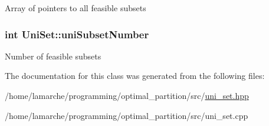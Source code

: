 Array of pointers to all feasible subsets \hypertarget{classUniSet_a159ec0413efd05616c2f2445b7d8b2b5}{
\subsubsection[{uni\-Subset\-Number}]{\setlength{\rightskip}{0pt plus 5cm}int Uni\-Set\-::uni\-Subset\-Number\hspace{0.3cm}{\ttfamily [protected]}}}\label{classUniSet_a159ec0413efd05616c2f2445b7d8b2b5}
Number of feasible subsets 

The documentation for this class was generated from the following files\-:\begin{DoxyCompactItemize}
\item 
/home/lamarche/programming/optimal\-\_\-partition/src/\hyperlink{uni__set_8hpp}{uni\-\_\-set.\-hpp}\item 
/home/lamarche/programming/optimal\-\_\-partition/src/uni\-\_\-set.\-cpp\end{DoxyCompactItemize}
